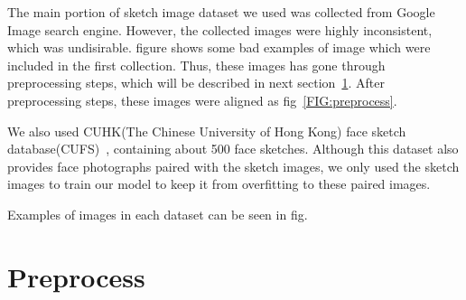 The main portion of sketch image dataset we used was collected from Google Image search engine. However, the collected images were highly inconsistent, which was undisirable. 
figure %
shows some bad examples of image which were included in the first collection. Thus, these images has gone through preprocessing steps, which will be described in next section~\ref{preprocess}.
After preprocessing steps, these images were aligned as fig~\ref{FIG:preprocess}.

We also used CUHK(The Chinese University of Hong Kong) face sketch database(CUFS)~\cite{CUHK_faces}, containing about 500 face sketches. 
Although this dataset also provides face photographs paired with the sketch images, we only used the sketch images to train our model to keep it from overfitting to these paired images.

Examples of images in each dataset can be seen in fig.%

\section{Preprocess}\label{preprocess}


